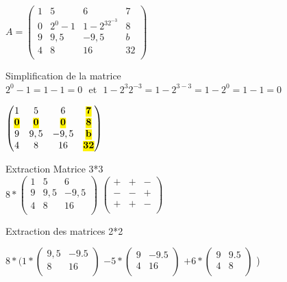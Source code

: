 $
A =
\begin{pmatrix}
  1 & 5 & 6 & 7 \\
  0 & 2^0-1 & 1-2^32^{-3} & 8 \\
  9 & 9,5 & -9,5 & b \\
  4 & 8 & 16 & 32 \\
\end{pmatrix}
$

\vspace{10mm} %
Simplification de la matrice \\

\vspace{2mm} %
$2^{0}-1 = 1-1 = 0$ $ $ et  $ $ $1-2^{3} 2^{-3} = 1-2^{3-3} = 1-2^{0} = 1-1 = 0$
\vspace{4mm} %

$
\begin{pmatrix}
  1 & 5 & 6 & \hl{\textbf{7}} \\
  \hl{\textbf{0}} & \hl{\textbf{0}} & \hl{\textbf{0}} & \hl{\textbf{8}} \\
  9 & 9,5 & -9,5 & \hl{\textbf{b}} \\
  4 & 8 & 16 & \hl{\textbf{32}} \\
\end{pmatrix}
$

\vspace{5mm} %
Extraction Matrice 3*3 \\

$
8*
\begin{pmatrix}
  1 & 5 & 6 \\
  9 & 9,5 & {-9,5} \\
  4 & 8 & 16 \\
\end{pmatrix}
$
$
\begin{pmatrix}
  + & + & - \\
  - & - & + \\
  + & + & - \\
\end{pmatrix}
$

\vspace{10mm} %
Extraction des matrices 2*2\\
\vspace{3mm} %

$
8*(
  1*
  \begin{pmatrix}
    9,5 & -9.5 \\
    8 & 16 \\
  \end{pmatrix}
  $
  $
  -5*
  \begin{pmatrix}
    9 & -9.5 \\
    4 & 16 \\
  \end{pmatrix}
  $
  $
  +6*
  \begin{pmatrix}
    9 & 9.5 \\
    4 & 8 \\
  \end{pmatrix}
  $
)

